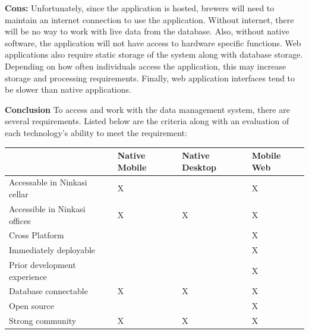 \documentclass[draftclsnofoot,onecolumn,letterpaper,10pt]{IEEEtran}
\begin{document}
\begin{itemize}
					\textbf{Cons:}
						Unfortunately, since the application is hosted, brewers will need to maintain an internet connection to use the application.
						Without internet, there will be no way to work with live data from the database.
						Also, without native software, the application will not have access to hardware specific functions.
						Web applications also require static storage of the system along with database storage.
						Depending on how often individuals access the application, this may increase storage and processing requirements.
						Finally, web application interfaces tend to be slower than native applications\cite{LifeWireOverview}.

			\end{itemize}

			\textbf{Conclusion}
			To access and work with the data management system, there are several requirements. Listed below are the criteria along with an evaluation of each technology's ability to meet the requirement:\\


					\begin{center}
							\begin{tabular}{ |m{14em}|m{9em}|m{9em}|m{9em}|}
									\hline
											& Native Mobile & Native Desktop & Mobile Web \\

									\hline
											Accessable in Ninkasi cellar & X & & X \\

									\hline
											Accessible in Ninkasi offices & X & X & X \\

									\hline
											Cross Platform &  &  & X \\

									\hline
											Immediately deployable &  &  & X \\

									\hline
											Prior development experience &  &  & X \\

									\hline
											 Database connectable & X & X & X \\

									\hline
											Open source & & & X \\

									\hline
											Strong community & X & X & X \\

									\hline

							\end{tabular}
					\end{center}
\end{document}
